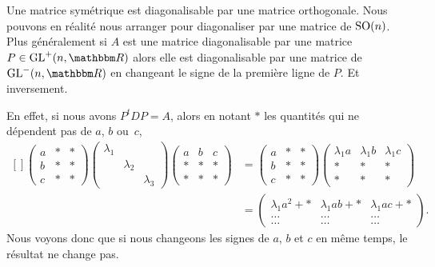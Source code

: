 \begin{remark}  \label{RemGKDZfxu}
    Une matrice symétrique est diagonalisable par une matrice orthogonale. Nous pouvons en réalité nous arranger pour diagonaliser par une matrice de \( \operatorname{SO}(n)\). Plus généralement si \( A\) est une matrice diagonalisable par une matrice \( P\in\GL^+(n,\eR)\) alors elle est diagonalisable par une matrice de \( \GL^-(n,\eR)\) en changeant le signe de la première ligne de \( P\). Et inversement.

    En effet, si nous avons \( P^tDP=A\), alors en notant \( *\) les quantités qui ne dépendent pas de \( a\), \( b\) ou~\( c\),
    \begin{equation}
        \begin{aligned}[]
        \begin{pmatrix}
            a    &   *    &   *    \\
            b    &   *    &   *    \\
            c    &   *    &   *
        \end{pmatrix}
        \begin{pmatrix}
            \lambda_1    &       &       \\
                &   \lambda_2    &       \\
                &       &   \lambda_3
            \end{pmatrix}
            \begin{pmatrix}
                a    &   b    &   c    \\
                *    &   *    &   *    \\
                *    &   *    &   *
            \end{pmatrix}&=
        \begin{pmatrix}
            a    &   *    &   *    \\
            b    &   *    &   *    \\
            c    &   *    &   *
        \end{pmatrix}
        \begin{pmatrix}
            \lambda_1a    &   \lambda_1b    &   \lambda_1c    \\
            *    &   *    &   *    \\
            *    &   *    &   *
        \end{pmatrix}\\
        &=\begin{pmatrix}
            \lambda_1 a^2+*   &   \lambda_1ab+*    &   \lambda_1ac  +*  \\
            \ldots    &   \ldots    &   \ldots    \\
            \ldots    &   \ldots    &   \ldots
        \end{pmatrix}.
        \end{aligned}
    \end{equation}
    Nous voyons donc que si nous changeons les signes de \( a\), \( b\) et \( c\) en même temps, le résultat ne change pas.
\end{remark}

